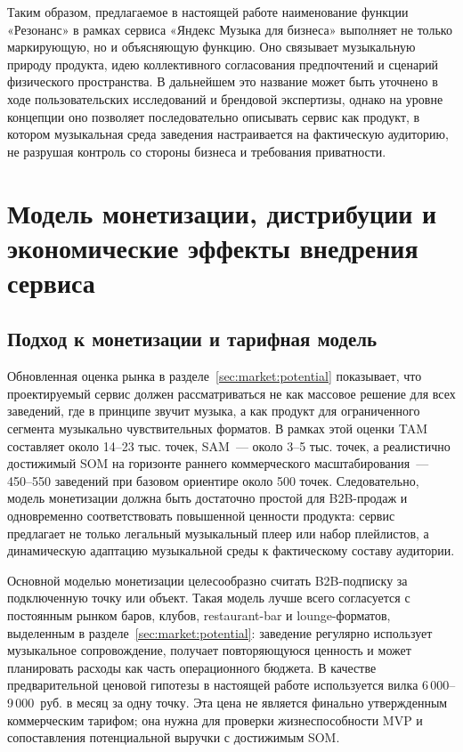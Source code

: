 Таким образом, предлагаемое в настоящей работе наименование функции «Резонанс» в рамках сервиса «Яндекс Музыка для бизнеса» выполняет не только маркирующую, но и объясняющую функцию. Оно связывает музыкальную природу продукта, идею коллективного согласования предпочтений и сценарий физического пространства. В дальнейшем это название может быть уточнено в ходе пользовательских исследований и брендовой экспертизы, однако на уровне концепции оно позволяет последовательно описывать сервис как продукт, в котором музыкальная среда заведения настраивается на фактическую аудиторию, не разрушая контроль со стороны бизнеса и требования приватности.

\section{Модель монетизации, дистрибуции и экономические эффекты внедрения сервиса}
\label{sec:service:monetization}

\subsection{Подход к монетизации и тарифная модель}
\label{subsec:service:monetization:tariffs}

Обновленная оценка рынка в разделе~\ref{sec:market:potential} показывает, что проектируемый сервис должен рассматриваться не как массовое решение для всех заведений, где в принципе звучит музыка, а как продукт для ограниченного сегмента музыкально чувствительных форматов. В рамках этой оценки TAM составляет около 14--23 тыс. точек, SAM~--- около 3--5 тыс. точек, а реалистично достижимый SOM на горизонте раннего коммерческого масштабирования~--- 450--550 заведений при базовом ориентире около 500 точек. Следовательно, модель монетизации должна быть достаточно простой для B2B-продаж и одновременно соответствовать повышенной ценности продукта: сервис предлагает не только легальный музыкальный плеер или набор плейлистов, а динамическую адаптацию музыкальной среды к фактическому составу аудитории.

Основной моделью монетизации целесообразно считать B2B-подписку за подключенную точку или объект. Такая модель лучше всего согласуется с постоянным рынком баров, клубов, restaurant-bar и lounge-форматов, выделенным в разделе~\ref{sec:market:potential}: заведение регулярно использует музыкальное сопровождение, получает повторяющуюся ценность и может планировать расходы как часть операционного бюджета. В качестве предварительной ценовой гипотезы в настоящей работе используется вилка 6\,000--9\,000~руб. в месяц за одну точку. Эта цена не является финально утвержденным коммерческим тарифом; она нужна для проверки жизнеспособности MVP и сопоставления потенциальной выручки с достижимым SOM.

